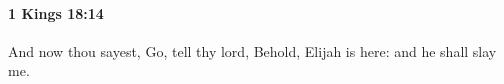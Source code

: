 
		\paragraph{1 Kings 18:14} %
			\label{1KINGS-18-14}

			And now thou sayest, Go, tell thy lord, Behold, Elijah is here: and he shall slay me.


